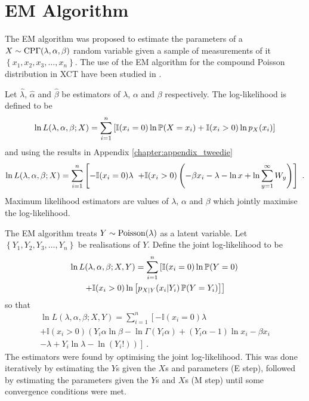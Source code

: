 \section{EM Algorithm}

The EM algorithm \citep{dempster1977maximum} was proposed to estimate the parameters of a $X\sim\operatorname{CP\Gamma}(\lambda,\alpha,\beta)$ random variable given a sample of measurements of it $\left\{x_1,x_2,x_3,\dotsc,x_n\right\}$. The use of the EM algorithm for the compound Poisson distribution in XCT have been studied in \cite{elbakri2003statistical, xie2008x, xu2009electronic}.

Let $\widehat{\lambda}$, $\widehat{\alpha}$ and $\widehat{\beta}$ be estimators of $\lambda$, $\alpha$ and $\beta$ respectively. The log-likelihood is defined to be
\begin{equation*}
  \ln L(\lambda,\alpha,\beta;X) = \sum_{i=1}^n
  \left[
    \mathbb{I}(x_i=0)\ln \operatorname{\mathbb{P}}(X=x_i)
    +\mathbb{I}(x_i>0)\ln p_X(x_i)
  \right]
\end{equation*}
and using the results in Appendix \ref{chapter:appendix_tweedie}
\begin{equation}
  \ln L(\lambda,\alpha,\beta;X) =
    \sum_{i=1}^n
    \left[
      -\mathbb{I}(x_i=0)\lambda
      \vphantom{\sum_i^i}
    \right.
    {}\\
    \left.
      +\mathbb{I}(x_i>0)\left(
      -\beta x_i-\lambda-\ln x +\ln\sum_{y=1}^\infty W_y
      \right)
    \right] \ .
\end{equation}
Maximum likelihood estimators are values of $\lambda$, $\alpha$ and $\beta$ which jointly maximise the log-likelihood.

The EM algorithm \citep{dempster1977maximum} treats $Y\sim\operatorname{Poisson}(\lambda)$ as a latent variable. Let $\left\{Y_1,Y_2,Y_3,\dotsc, Y_n\right\}$ be realisations of $Y$. Define the joint log-likelihood to be
\begin{multline*}
  \ln L(\lambda,\alpha,\beta;X,Y)
  =
  \sum_{i=1}^n
  \left[
    \mathbb{I}(x_i=0)
    \ln
    \operatorname{\mathbb{P}}(Y=0)
  \right.
  \\
  \left.
    +
    \mathbb{I}(x_i>0)
    \ln
    \left[
      p_{X|Y}(x_i|Y_i)\operatorname{\mathbb{P}}(Y=Y_i)
    \right]
  \right]
\end{multline*}
so that
\begin{multline}
  \ln L(\lambda,\alpha,\beta;X,Y)=
  \sum_{i=1}^n
  \left[
    -\mathbb{I}(x_i=0)
    \lambda
  \right.
  \\
  \left.+
    \mathbb{I}(x_i>0)
    \left(
      Y_i\alpha\ln\beta-\ln\Gamma(Y_i\alpha)+(Y_i\alpha-1)\ln x_i - \beta x_i
    \right.
  \right.
  \\
  \left.
    \left.  
      - \lambda + Y_i \ln \lambda - \ln(Y_i!)
    \right)
  \right]
  \ .
  \label{eq:compoundPoisson_jointLogLikelihood}
\end{multline}
The estimators were found by optimising the joint log-likelihood. This was done iteratively by estimating the $Y$s given the $X$s and parameters (E step), followed by estimating the parameters given the $Y$s and $X$s (M step) until some convergence conditions were met.

